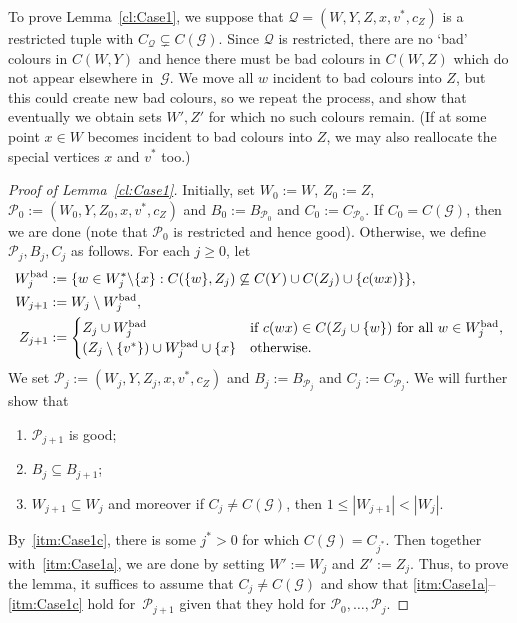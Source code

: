 \documentclass[a4paper, 12pt]{article}
\numberwithin{equation}{section}
\def\sm{{\setminus}}
\newcommand{\mc}[1]{\mathcal{#1}}
\newcommand{\ms}[1]{\mathscr{#1}}
\begin{document}
To prove Lemma~\ref{cl:Case1}, 
we suppose that $\mc{Q} = (W,Y,Z,x,v^*,c_Z)$ is a restricted tuple with $C_{\mc{Q}} \subsetneq C(\ms{G})$.
Since $\mc{Q}$ is restricted, there are no `bad' colours in $C(W,Y)$ and hence there must be bad colours in $C(W,Z)$ which do not appear elsewhere in~$\ms{G}$. 
We move all $w$ incident to bad colours into $Z$, but this could create new bad colours, so we repeat the process,
and show that eventually we obtain sets $W',Z'$ for which no such colours remain. 
(If at some point $x \in W$ becomes incident to bad colours into $Z$, we may also reallocate the special vertices $x$ and $v^*$ too.)

\begin{proof}[Proof of Lemma~\ref{cl:Case1}]
Initially, set $W_0 := W$,  $Z_0 := Z$, $\mc{P}_0 := (W_0, Y,Z_0, x, v^*, c_Z)$ and $B_0 := B_{\mc{P}_0}$ and $C_0 := C_{\mc{P}_0}$.
If $C_0 = C(\ms{G})$, then we are done (note that $\mc{P}_0$ is restricted and hence good).
Otherwise, we define $\mc{P}_j, B_j, C_j$ as follows. 
For each $j \geq 0$, let
\begin{align*}
W_j^{\rm bad} &:= 
 \{ w \in W^*_j\sm\{x\} : C(\{w\},Z_j) \not\subseteq C(Y) \cup C(Z_j) \cup \{c(wx)\}\},\\
W_{j+1} &:= W_j \setminus W^{\rm bad}_j,\\
   Z_{j+1} &:=
 \begin{cases}
 Z_j \cup W^{\rm bad}_j &\text{if $c(wx) \in C(Z_j \cup \{w\})$ for all $w \in W^{\rm bad}_j$},  \\
 ( Z_j \setminus \{v^*\} ) \cup W^{\rm bad}_j \cup \{x\}
 &\text{otherwise.}
 \end{cases}
 \end{align*}
We set $\mc{P}_j := (W_j, Y,Z_j, x, v^*, c_Z)$ and $B_j := B_{\mc{P}_j}$ and $C_j := C_{\mc{P}_j}$.
We will further show that 
\begin{enumerate}[label = {\rm (\alph*)}]
    \item $\mc{P}_{j+1}$ is good; \label{itm:Case1a}
    \item $B_{j} \subseteq B_{j+1}$; \label{itm:Case1b}
    \item $W_{j+1} \subseteq W_j$ and moreover if $C_j \ne C(\ms{G})$, then $1 \le |W_{j+1}| < |W_j|$. \label{itm:Case1c}
\end{enumerate}
By~\ref{itm:Case1c}, there is some $j^* > 0$ for which $C(\ms{G}) = C_{j^*}$.
Then together with~\ref{itm:Case1a}, we are done by setting $W' := W_j$ and $Z' := Z_j$. 
Thus, to prove the lemma, it suffices to assume that $C_j \ne C(\ms{G})$ and show that \ref{itm:Case1a}--\ref{itm:Case1c} hold for~$\mc{P}_{j+1}$ given that they hold for $\mc{P}_{0},\ldots,\mc{P}_j$. 



\end{proof}
\end{document}

